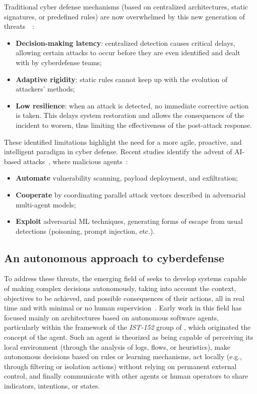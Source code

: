 Traditional cyber defense mechanisms (based on centralized architectures, static signatures, or predefined rules) are now overwhelmed by this new generation of threats~\cite{Kott2023}~:
\begin{itemize}
  \item \textbf{Decision-making latency}: centralized detection causes critical delays, allowing certain attacks to occur before they are even identified and dealt with by cyberdefense teams;
  \item \textbf{Adaptive rigidity}: static rules cannot keep up with the evolution of attackers' methods;
  \item \textbf{Low resilience}: when an attack is detected, no immediate corrective action is taken. This delays system restoration and allows the consequences of the incident to worsen, thus limiting the effectiveness of the post-attack response.
\end{itemize}

These identified limitations highlight the need for a more agile, proactive, and intelligent paradigm in cyber defense. Recent studies identify the advent of AI-based attacks~\cite{Miles2018,AutoAttacker2024,Falong2025}, where malicious agents~:
\begin{itemize}

  \textbf{Automate} the search for vulnerabilities, the deployment of payloads, and exfiltration~;

  {itemize}
  \item \textbf{Automate} vulnerability scanning, payload deployment, and exfiltration;
  \item \textbf{Cooperate} by coordinating parallel attack vectors described in adversarial multi-agent models;
  \item \textbf{Exploit} adversarial ML techniques, generating forms of escape from usual detections (poisoning, prompt injection, etc.).
\end{itemize}

\subsection*{An autonomous approach to cyberdefense}

To address these threats, the emerging field of  seeks to develop systems capable of making complex decisions autonomously, taking into account the context, objectives to be achieved, and possible consequences of their actions, all in real time and with minimal or no human supervision~\cite{Vyas2023}. Early work in this field has focused mainly on architectures based on autonomous software agents, particularly within the framework of the \textit{IST-152} group of , which originated the concept of the  agent.
Such an agent is theorized as being capable of perceiving its local environment (through the analysis of logs, flows, or heuristics), make autonomous decisions based on rules or learning mechanisms, act locally (e.g., through filtering or isolation actions) without relying on permanent external control, and finally communicate with other agents or human operators to share indicators, intentions, or states.

